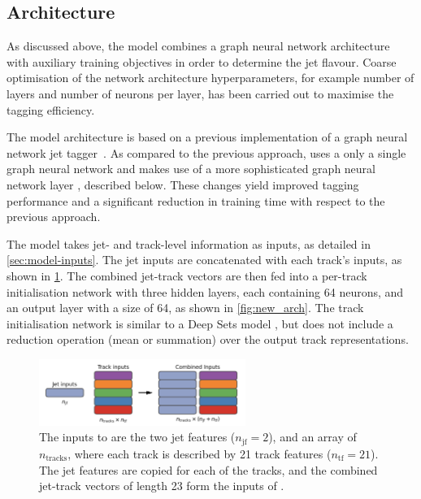 \subsection{Architecture}\label{sec:Architecture}

As discussed above, the \GNN model combines a graph neural network architecture~\cite{2020-gnn-in-particle-physics} with auxiliary training objectives in order to determine the jet flavour.
Coarse optimisation of the network architecture hyperparameters, for example number of layers and number of neurons per layer, has been carried out to maximise the tagging efficiency.

The model architecture is based on a previous implementation of a graph neural network jet tagger~\cite{serviansky2020set2graph}.
As compared to the previous approach, \GNN uses a only a single graph neural network and makes use of a more sophisticated graph neural network layer \cite{2021arXiv210514491B}, described below.
These changes yield improved tagging performance and a significant reduction in training time with respect to the previous approach.


The model takes jet- and track-level information as inputs, as detailed in \cref{sec:model-inputs}.
The jet inputs are concatenated with each track's inputs, as shown in \cref{fig:model_input_array}.
The combined jet-track vectors are then fed into a per-track initialisation network with three hidden layers, each containing 64 neurons, and an output layer with a size of 64, as shown in \cref{fig:new_arch}. 
The track initialisation network is similar to a Deep Sets model \cite{zaheer2018deep}, but does not include a reduction operation (mean or summation) over the output track representations.

\begin{figure}[!htbp]
    \centering
    \includegraphics[width=0.6\textwidth]{chapters/gnn_tagger/figs/inputs_diagram.png}
    \caption{The inputs to \GNN are the two jet features ($n_\text{jf} = 2$), and an array of $n_{\text{tracks}}$, where each track is described by 21 track features ($n_\text{tf} = 21$). The jet features are copied for each of the tracks, and the combined jet-track vectors of length 23 form the inputs of \GNN.}
    \label{fig:model_input_array}
\end{figure}

